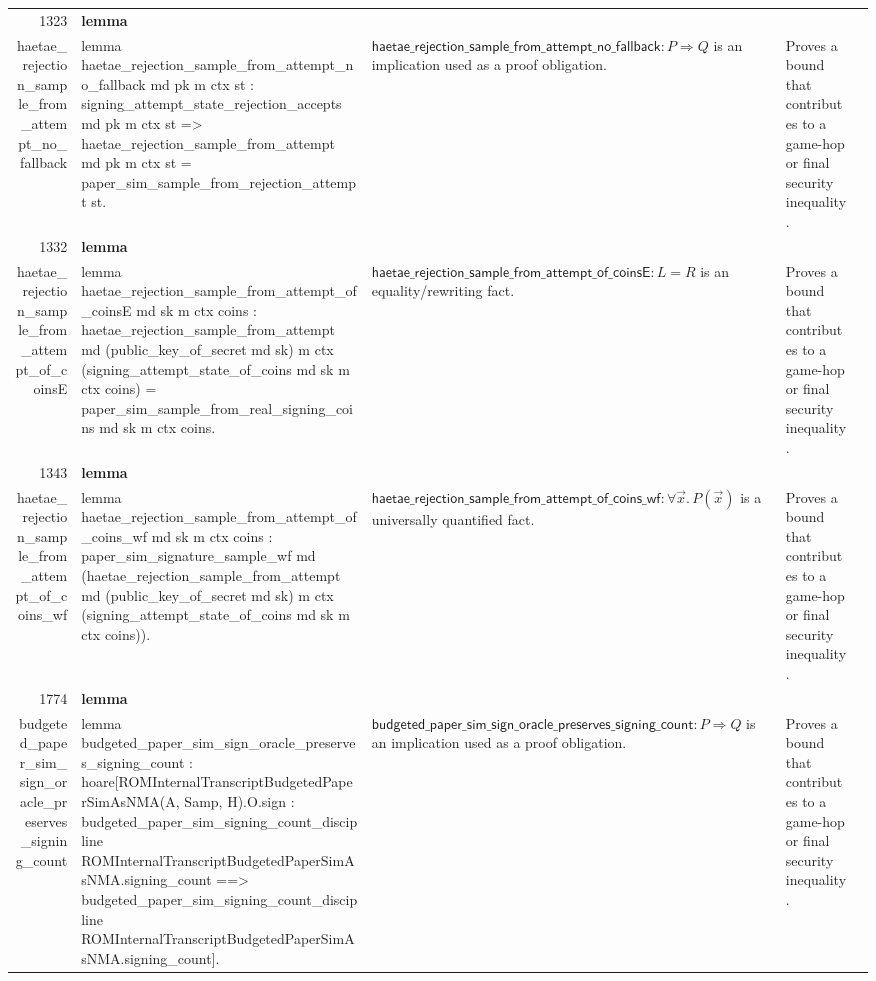 \documentclass[10pt]{article}
\newcommand{\ec}[1]{\begingroup\ttfamily\scriptsize #1\endgroup}
\begin{document}
\begin{longtable}{r L{0.17\textwidth} L{0.26\textwidth} L{0.27\textwidth} L{0.20\textwidth}}
1323 & \textbf{lemma}\\\ec{haetae\_rejection\_sample\_from\_attempt\_no\_fallback} & \ec{lemma haetae\_rejection\_sample\_from\_attempt\_no\_fallback md pk m ctx st : signing\_attempt\_state\_rejection\_accepts md pk m ctx st => haetae\_rejection\_sample\_from\_attempt md pk m ctx st = paper\_sim\_sample\_from\_rejection\_attempt st.} & \(\mathsf{haetae\_rejection\_sample\_from\_attempt\_no\_fallback} : P \Rightarrow Q\) is an implication used as a proof obligation. & Proves a bound that contributes to a game-hop or final security inequality. \\
1332 & \textbf{lemma}\\\ec{haetae\_rejection\_sample\_from\_attempt\_of\_coinsE} & \ec{lemma haetae\_rejection\_sample\_from\_attempt\_of\_coinsE md sk m ctx coins : haetae\_rejection\_sample\_from\_attempt md (public\_key\_of\_secret md sk) m ctx (signing\_attempt\_state\_of\_coins md sk m ctx coins) = paper\_sim\_sample\_from\_real\_signing\_coins md sk m ctx coins.} & \(\mathsf{haetae\_rejection\_sample\_from\_attempt\_of\_coinsE} : L = R\) is an equality/rewriting fact. & Proves a bound that contributes to a game-hop or final security inequality. \\
1343 & \textbf{lemma}\\\ec{haetae\_rejection\_sample\_from\_attempt\_of\_coins\_wf} & \ec{lemma haetae\_rejection\_sample\_from\_attempt\_of\_coins\_wf md sk m ctx coins : paper\_sim\_signature\_sample\_wf md (haetae\_rejection\_sample\_from\_attempt md (public\_key\_of\_secret md sk) m ctx (signing\_attempt\_state\_of\_coins md sk m ctx coins)).} & \(\mathsf{haetae\_rejection\_sample\_from\_attempt\_of\_coins\_wf} : \forall \vec{x}.\, P(\vec{x})\) is a universally quantified fact. & Proves a bound that contributes to a game-hop or final security inequality. \\
1774 & \textbf{lemma}\\\ec{budgeted\_paper\_sim\_sign\_oracle\_preserves\_signing\_count} & \ec{lemma budgeted\_paper\_sim\_sign\_oracle\_preserves\_signing\_count : hoare[ROMInternalTranscriptBudgetedPaperSimAsNMA(A, Samp, H).O.sign : budgeted\_paper\_sim\_signing\_count\_discipline ROMInternalTranscriptBudgetedPaperSimAsNMA.signing\_count ==> budgeted\_paper\_sim\_signing\_count\_discipline ROMInternalTranscriptBudgetedPaperSimAsNMA.signing\_count].} & \(\mathsf{budgeted\_paper\_sim\_sign\_oracle\_preserves\_signing\_count} : P \Rightarrow Q\) is an implication used as a proof obligation. & Proves a bound that contributes to a game-hop or final security inequality. \\

\end{longtable}
\end{document}
